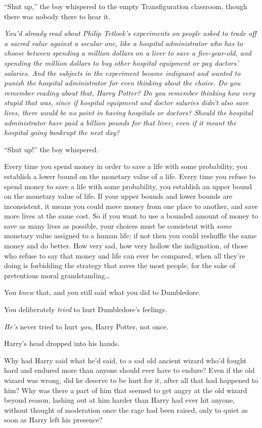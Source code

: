 “Shut up,” the boy whispered to the empty Transfiguration classroom, though there was nobody there to hear it.

\emph{You’d already read about Philip Tetlock’s experiments on people asked to trade off a sacred value against a secular one, like a hospital administrator who has to choose between spending a million dollars on a liver to save a five-year-old, and spending the million dollars to buy other hospital equipment or pay doctors’ salaries. And the subjects in the experiment became indignant and wanted to punish the hospital administrator for even thinking about the choice. Do you remember reading about that, Harry Potter? Do you remember thinking how very stupid that was, since if hospital equipment and doctor salaries didn’t also save lives, there would be no point in having hospitals or doctors? Should the hospital administrator have paid a billion pounds for that liver, even if it meant the hospital going bankrupt the next day?}

“Shut up!” the boy whispered.

\begin{em}
Every time you spend money in order to save a life with some probability, you establish a lower bound on the monetary value of a life. Every time you refuse to spend money to save a life with some probability, you establish an upper bound on the monetary value of life. If your upper bounds and lower bounds are inconsistent, it means you could move money from one place to another, and save more lives at the same cost. So if you want to use a bounded amount of money to save as many lives as possible, your choices must be consistent with \emph{some} monetary value assigned to a human life; if not then you could reshuffle the same money and do better. How very sad, how very hollow the indignation, of those who refuse to say that money and life can ever be compared, when all they’re doing is forbidding the strategy that saves the most people, for the sake of pretentious moral grandstanding…

You \emph{knew} that, and you still said what you did to Dumbledore.

You deliberately \emph{tried} to hurt Dumbledore’s feelings.

\emph{He’s} never tried to hurt \emph{you,} Harry Potter, not once.
\end{em}

Harry’s head dropped into his hands.

Why had Harry said what he’d said, to a sad old ancient wizard who’d fought hard and endured more than anyone should ever have to endure? Even if the old wizard was wrong, did he deserve to be hurt for it, after all that had happened to him? Why was there a part of him that seemed to get angry at the old wizard beyond reason, lashing out at him harder than Harry had ever hit anyone, without thought of moderation once the rage had been raised, only to quiet as soon as Harry left his presence?

